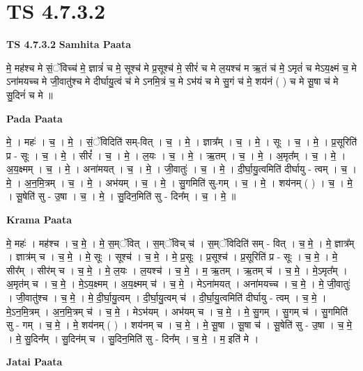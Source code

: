 \documentclass[17pt]{extarticle}
\begin{document}
\section{ TS 4.7.3.2 }

\textbf{TS 4.7.3.2 } \newline
\textbf{Samhita Paata} \newline

मे॒ मह॑श्च मे सं॒ॅविच्च॑ मे॒ ज्ञात्रं॑ च मे॒ सूश्च॑ मे प्र॒सूश्च॑ मे॒ सीरं॑ च मे ल॒यश्च॑ म ऋ॒तं च॑ मे॒ ऽमृतं॑ च मेऽय॒क्ष्मं च॒ मे ऽना॑मयच्च मे जी॒वातु॑श्च मे दीर्घायु॒त्वं च॑ मे ऽनमि॒त्रं च॒ मे ऽभ॑यं च मे सु॒गं च॑ मे॒ शय॑नं ( ) च मे सू॒षा च॑ मे सु॒दिनं॑ च मे ॥ \newline

\textbf{Pada Paata} \newline

मे॒ । महः॑ । च॒ । मे॒ । सं॒ॅविदिति॑ सम्-वित् । च॒ । मे॒ । ज्ञात्र᳚म् । च॒ । मे॒ । सूः । च॒ । मे॒ । प्र॒सूरिति॑ प्र - सूः । च॒ । मे॒ । सीरं᳚ । च॒ । मे॒ । ल॒यः । च॒ । मे॒ । ऋ॒तम् । च॒ । मे॒ । अ॒मृत᳚म् । च॒ । मे॒ । अ॒य॒क्ष्मम् । च॒ । मे॒ । अना॑मयत् । च॒ । मे॒ । जी॒वातुः॑ । च॒ । मे॒ । दी॒र्घा॒यु॒त्वमिति॑ दीर्घायु - त्वम् । च॒ । मे॒ । अ॒न॒मि॒त्रम् । च॒ । मे॒ । अभ॑यम् । च॒ । मे॒ । सु॒गमिति॑ सु-गम् । च॒ । मे॒ । शय॑नम् ( ) । च॒ । मे॒ । सू॒षेति॑ सु - उ॒षा । च॒ । मे॒ । सु॒दिन॒मिति॑ सु - दिन᳚म् । च॒ । मे॒ ॥  \newline


\textbf{Krama Paata} \newline

मे॒ महः॑ । मह॑श्च । च॒ मे॒ । मे॒ स॒म्ॅवित् । स॒म्ॅविच् च॑ । स॒म्ॅविदिति॑ सम् - वित् । च॒ मे॒ । मे॒ ज्ञात्र᳚म् । ज्ञात्र॑म् च । च॒ मे॒ । मे॒ सूः । सूश्च॑ । च॒ मे॒ । मे॒ प्र॒सूः । प्र॒सूश्च॑ । प्र॒सूरिति॑ प्र - सूः । च॒ मे॒ । मे॒ सीर᳚म् । सीर॑म् च । च॒ मे॒ । मे॒ ल॒यः । ल॒यश्च॑ । च॒ मे॒ । म॒ ऋ॒तम् । ऋ॒तम् च॑ । च॒ मे॒ । मे॒ऽमृत᳚म् । अ॒मृत॑म् च । च॒ मे॒ । मे॒ऽय॒क्ष्मम् । अ॒य॒क्ष्मम् च॑ । च॒ मे॒ । मेऽना॑मयत् । अना॑मयच्च । च॒ मे॒ । मे॒ जी॒वातुः॑ । जी॒वातु॑श्च । च॒ मे॒ । मे॒ दी॒र्घा॒यु॒त्वम् । दी॒र्घा॒यु॒त्वम् च॑ । दी॒र्घा॒यु॒त्वमिति॑ दीर्घायु - त्वम् । च॒ मे॒ । मे॒ऽन॒मि॒त्रम् । अ॒न॒मि॒त्रम् च॑ । च॒ मे॒ । मेऽभ॑यम् । अभ॑यम् च । च॒ मे॒ । मे॒ सु॒गम् । सु॒गम् च॑ । सु॒गमिति॑ सु - गम् । च॒ मे॒ । मे॒ शय॑नम् ( ) । शय॑नम् च । च॒ मे॒ । मे॒ सू॒षा । सू॒षा च॑ । सू॒षेति॑ सु - उ॒षा । च॒ मे॒ । मे॒ सु॒दिन᳚म् । सु॒दिन॑म् च । सु॒दिन॒मिति॑ सु - दिन᳚म् । च॒ मे॒ । म॒ इति॑ मे । \newline

\textbf{Jatai Paata} \newline
\end{document}
